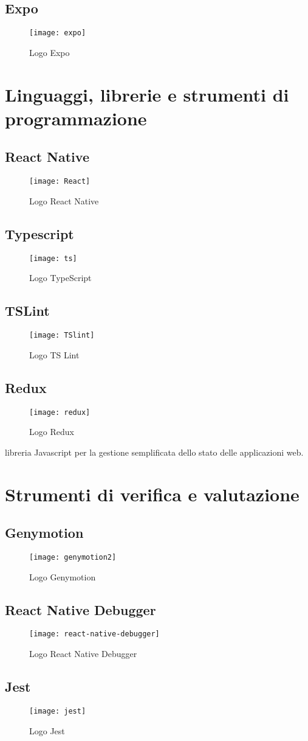 \subsection{Expo}
\begin{figure}[H] 
	\centering
	\texttt{[image: expo]}
	\caption{Logo Expo}
\end{figure}

\section{Linguaggi, librerie e strumenti di programmazione}
\subsection{React Native}
\begin{figure}[H] 
	\centering
	\texttt{[image: React]}
	\caption{Logo React Native}
\end{figure}
\subsection{Typescript}
\begin{figure}[H] 
	\centering
	\texttt{[image: ts]}
	\caption{Logo TypeScript}
\end{figure}
\subsection{TSLint}
\begin{figure}[H] 
	\centering
	\texttt{[image: TSlint]}
	\caption{Logo TS Lint}
\end{figure}
\subsection{Redux}
\begin{figure}[H] 
	\centering
	\texttt{[image: redux]}
	\caption{Logo Redux}
\end{figure}
 libreria Javascript per la gestione semplificata dello stato delle applicazioni web.
 
\section{Strumenti di verifica e valutazione}
\subsection{Genymotion}
\begin{figure}[H] 
	\centering
	\texttt{[image: genymotion2]}
	\caption{Logo Genymotion}
	
\end{figure}
\subsection{React Native Debugger}
\begin{figure}[H] 
	\centering
	\texttt{[image: react-native-debugger]}
	\caption{Logo React Native Debugger}
\end{figure}
\subsection{Jest}
\begin{figure}[H] 
	\centering
	\texttt{[image: jest]}
	\caption{Logo Jest}
\end{figure}
